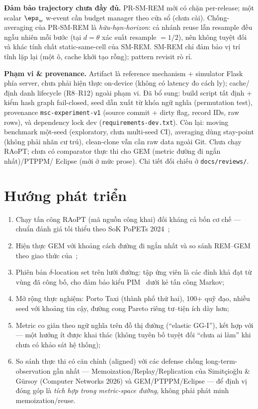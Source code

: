 \textbf{Đảm bảo trajectory chưa đầy đủ.} PR-SM-REM mới có chặn per-release; một
scalar $\eps_w$ w-event cần budget manager theo cửa sổ (chưa cài). Chống-averaging
của PR-SM-REM là \emph{hữu-hạn-horizon}: cả nhánh reuse lẫn resample đều ngẫu nhiên
mỗi bước (tại $d{=}\theta$ xác suất resample $=1/2$), nên không tuyệt đối và khác
tính chất static-same-cell của SM-REM. SM-REM chỉ đảm bảo vị trí tĩnh lặp lại (một
ô, cache khởi tạo rỗng); pattern revisit rò rỉ.

\textbf{Phạm vi \& provenance.} Artifact là reference mechanism + simulator Flask
phía server, chưa phải hiện thực on-device (không có latency đo cách ly);
cache/định danh lifecycle (R8--R12) ngoài phạm vi. Đã bổ sung: build script tất
định + kiểm hash graph fail-closed, seed dẫn xuất từ khóa ngữ nghĩa (permutation
test), provenance \texttt{msc-experiment-v1} (source commit + dirty flag, record
IDs, raw rows), và dependency lock dev (\texttt{requirements-dev.txt}). Còn lại:
moving benchmark một-seed (exploratory, chưa multi-seed CI), averaging dùng
stay-point (không phải nhãn cư trú), clean-clone vẫn cần raw data ngoài Git. Chưa
chạy RAoPT; chưa có comparator thực thi cho GEM (metric đường đi ngắn nhất)/PTPPM/
Eclipse (mới ở mức prose). Chi tiết đối chiếu ở \texttt{docs/reviews/}.

\section{Hướng phát triển}

\begin{enumerate}
  \item Chạy tấn công RAoPT (mã nguồn công khai) đối kháng cả bốn cơ chế ---
  chuẩn đánh giá tối thiểu theo SoK PoPETs 2024~\cite{buchholz2024sok};
  \item Hiện thực GEM với khoảng cách đường đi ngắn nhất và so sánh REM--GEM
  theo giao thức của~\cite{takagi2019geo};
  \item Phiên bản $\delta$-location set trên lưới đường: tập ứng viên là các
  đỉnh khả đạt từ vùng đã công bố, cho đảm bảo kiểu PIM~\cite{xiao2015protecting}
  dưới kẻ tấn công Markov;
  \item Mở rộng thực nghiệm: Porto Taxi (thành phố thứ hai), 100+ quỹ đạo,
  nhiều seed với khoảng tin cậy, đường cong Pareto riêng tư--tiện ích dày hơn;
  \item Metric co giãn theo ngữ nghĩa trên đồ thị đường (``elastic GG-I''), kết
  hợp \cite{chatzikokolakis2015elastic} với \cite{takagi2019geo} --- một hướng ít
  được khai thác (không tuyên bố tuyệt đối ``chưa ai làm'' khi chưa có khảo sát
  hệ thống);
  \item So sánh thực thi có căn chỉnh (aligned) với các defense chống
  long-term-observation gần nhất --- Memoization/Replay/Replication của
  Simitçioğlu \& Gürsoy (Computer Networks 2026) và GEM/PTPPM/Eclipse --- để định
  vị đóng góp là \emph{tích hợp trong metric-space đường}, không phải phát minh
  memoization/reuse.
\end{enumerate}
